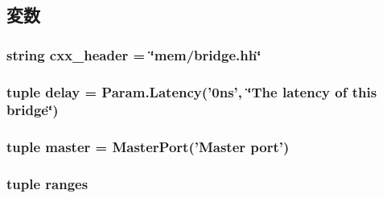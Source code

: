 \subsection{変数}
\hypertarget{classBridge_1_1Bridge_a17da7064bc5c518791f0c891eff05fda}{
\subsubsection[{cxx\_\-header}]{\setlength{\rightskip}{0pt plus 5cm}string {\bf cxx\_\-header} = \char`\"{}mem/bridge.hh\char`\"{}}}
\label{classBridge_1_1Bridge_a17da7064bc5c518791f0c891eff05fda}
\hypertarget{classBridge_1_1Bridge_ac1ab55b34347f0110eb273c9d47d52e2}{
\subsubsection[{delay}]{\setlength{\rightskip}{0pt plus 5cm}tuple {\bf delay} = Param.Latency('0ns', \char`\"{}The latency of this bridge\char`\"{})}}
\label{classBridge_1_1Bridge_ac1ab55b34347f0110eb273c9d47d52e2}
\hypertarget{classBridge_1_1Bridge_a0f74d64e6817f0f89bafc52ff3c56cbb}{
\subsubsection[{master}]{\setlength{\rightskip}{0pt plus 5cm}tuple {\bf master} = {\bf MasterPort}('Master port')}}
\label{classBridge_1_1Bridge_a0f74d64e6817f0f89bafc52ff3c56cbb}
\hypertarget{classBridge_1_1Bridge_abe08d3b07d6b72953260a39c8428ecf5}{
\subsubsection[{ranges}]{\setlength{\rightskip}{0pt plus 5cm}tuple {\bf ranges}}}
